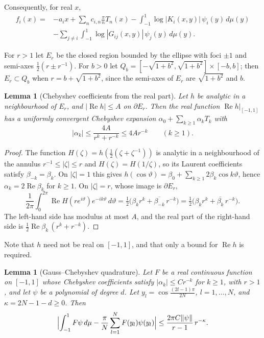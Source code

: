 \documentclass[11pt]{amsart}
\newtheorem{lemma}[proposition]{Lemma}
\theoremstyle{remark}
\newcommand{\re}{\operatorname{Re}}
\begin{document}
Consequently, for real $x$,
\begin{equation}\label{eq:f}
\begin{aligned}
f_i(x)={}&-a_ix+\sum_{n}c_{i,n}\frac\pi n T_n(x)-\int_{-1}^1\log|K_i(x,y)|\,\psi_i(y)\,d\mu(y)\\
&-\sum_{j\ne i}\int_{-1}^1\log|G_{ij}(x,y)|\,\psi_j(y)\,d\mu(y).
\end{aligned}
\end{equation}

For $r>1$ let $E_r$ be the closed region bounded by the ellipse with foci $\pm1$ and semi-axes
$\frac12(r\pm r^{-1})$. For $b>0$ let $Q_b=[-\sqrt{1+b^2},\sqrt{1+b^2}]\times[-b,b]$; then $E_r\subset Q_b$
when $r=b+\sqrt{1+b^2}$, since the semi-axes of $E_r$ are $\sqrt{1+b^2}$ and $b$.

\begin{lemma}[Chebyshev coefficients from the real part]\label{lem:coef}
Let $h$ be analytic in a neighbourhood of $E_r$, and $|\re h|\le A$ on $\partial E_r$. Then the real function
$\re h|_{[-1,1]}$ has a uniformly convergent Chebyshev expansion $\alpha_0+\sum_{k\ge1}\alpha_kT_k$ with
\[
|\alpha_k|\le\frac{4A}{r^k+r^{-k}}\le4Ar^{-k}\qquad(k\ge1).
\]
\end{lemma}

\begin{proof}
The function $H(\zeta)=h(\tfrac12(\zeta+\zeta^{-1}))$ is analytic in a neighbourhood of the annulus
$r^{-1}\le|\zeta|\le r$ and $H(\zeta)=H(1/\zeta)$, so its Laurent coefficients satisfy $\beta_{-k}=\beta_k$. On
$|\zeta|=1$ this gives $h(\cos\vartheta)=\beta_0+\sum_{k\ge1}2\beta_k\cos k\vartheta$, hence $\alpha_k=2\re\beta_k$
for $k\ge1$. On $|\zeta|=r$, whose image is $\partial E_r$,
\[
\frac1{2\pi}\int_0^{2\pi}\re H(re^{i\vartheta})e^{-ik\vartheta}\,d\vartheta
=\tfrac12\bigl(\beta_kr^k+\overline{\beta_{-k}}\,r^{-k}\bigr)=\tfrac12\bigl(\beta_kr^k+\overline{\beta_k}\,r^{-k}\bigr).
\]
The left-hand side has modulus at most $A$, and the real part of the right-hand side is
$\tfrac12\re\beta_k\,(r^k+r^{-k})$.
\end{proof}

Note that $h$ need not be real on $[-1,1]$, and that only a bound for $\re h$ is required.

\begin{lemma}[Gauss--Chebyshev quadrature]\label{lem:quad}
Let $F$ be a real continuous function on $[-1,1]$ whose Chebyshev coefficients satisfy $|\alpha_k|\le Cr^{-k}$ for
$k\ge1$, with $r>1$, and let $\psi$ be a polynomial of degree $d$. Let $y_l=\cos\frac{(2l-1)\pi}{2N}$,
$l=1,\dots,N$, and $\kappa=2N-1-d\ge0$. Then
\[
\Bigl|\int_{-1}^1F\psi\,d\mu-\frac\pi N\sum_{l=1}^NF(y_l)\psi(y_l)\Bigr|\le\frac{2\pi C\|\psi\|}{r-1}\,r^{-\kappa}.
\]
\end{lemma}
\end{document}
